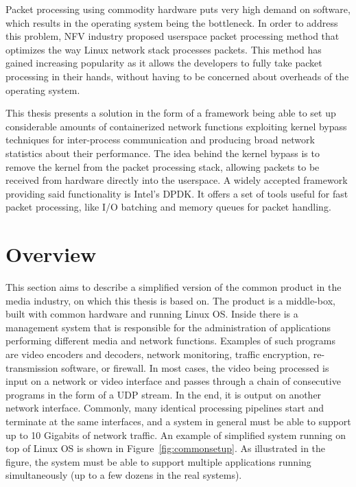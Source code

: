 \documentclass[english]{kththesis}
\begin{document}
Packet processing using commodity hardware puts very high demand on software, which results in the operating system being the bottleneck. In order to address this problem, \gls{NFV} industry proposed userspace packet processing method that optimizes the way Linux network stack processes packets. This method has gained increasing popularity as it allows the developers to fully take packet processing in their hands, without having to be concerned about overheads of the operating system.

This thesis presents a solution in the form of a framework being able to set up considerable amounts of containerized network functions exploiting kernel bypass techniques for inter-process communication and producing broad network statistics about their performance. The idea behind the kernel bypass is to remove the kernel from the packet processing stack, allowing packets to be received from hardware directly into the userspace. A widely accepted framework providing said functionality is Intel's \gls{DPDK}. It offers a set of tools useful for fast packet processing, like I/O batching and memory queues for packet handling.


\section{Overview}
\label{sec:background}
This section aims to describe a simplified version of the common product in the media industry, on which this thesis is based on. The product is a middle-box, built with common hardware and running Linux OS. Inside there is a management system that is responsible for the administration of applications performing different media and network functions. Examples of such programs are video encoders and decoders, network monitoring, traffic encryption, re-transmission software, or firewall. In most cases, the video being processed is input on a network or video interface and passes through a chain of consecutive programs in the form of a UDP stream. In the end, it is output on another network interface. Commonly, many identical processing pipelines start and terminate at the same interfaces, and a system in general must be able to support up to 10 Gigabits of network traffic. An example of simplified system running on top of Linux OS is shown in Figure~\ref{fig:commonsetup}. As illustrated in the figure, the system must be able to support multiple applications running simultaneously (up to a few dozens in the real systems).
\end{document}
